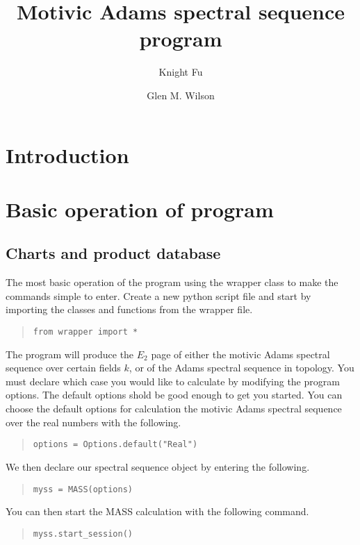 \documentclass{article}
\begin{document}
\title{Motivic Adams spectral sequence program}
\author{Knight Fu}
\author{Glen M. Wilson}
\maketitle


\section{Introduction}

\section{Basic operation of program}
\subsection{Charts and product database}

The most basic operation of the program using the wrapper class to
make the commands simple to enter. Create a new python script file and
start by importing the classes and functions from the wrapper file.

\begin{quote}
\begin{verbatim}
from wrapper import *
\end{verbatim}
\end{quote}

The program will produce the $E_2$ page of either the motivic Adams
spectral sequence over certain fields $k$, or of the Adams spectral
sequence in topology. You must declare which case you would like to
calculate by modifying the program options. The default options shold
be good enough to get you started. You can choose the default options
for calculation the motivic Adams spectral sequence over the real
numbers with the following.
\begin{quote}
\begin{verbatim}
options = Options.default("Real")
\end{verbatim}
\end{quote}

We then declare our spectral sequence object by entering the
following.
\begin{quote}
\begin{verbatim}
myss = MASS(options)
\end{verbatim}
\end{quote}
You can then start the MASS calculation with the following command.
\begin{quote}
\begin{verbatim}
myss.start_session()
\end{verbatim}
\end{quote}
\end{document}
